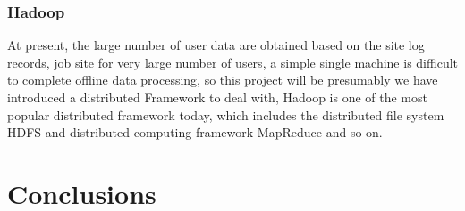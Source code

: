 \documentclass[sigconf]{acmart}
\begin{document}
\subsubsection{Hadoop}
At present, the large number of user data are obtained based on the site log records, job site for very large number of users, a simple single machine is difficult to complete offline data processing, so this project will be presumably we have introduced a distributed Framework to deal with, Hadoop is one of the most popular distributed framework today, which includes the distributed file system HDFS and distributed computing framework MapReduce and so on.


\section{Conclusions}
 





 
\end{document}
